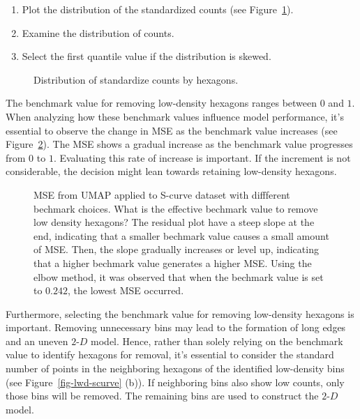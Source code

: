 \documentclass[
  12pt]{article}
\providecommand{\tightlist}{%
  \setlength{\itemsep}{0pt}\setlength{\parskip}{0pt}}\usepackage{longtable,booktabs,array}
\def\tightlist{}
\newcommand\gD{$2\text{-}D$}
\begin{document}
\begin{enumerate}
\def\labelenumi{\arabic{enumi}.}
\tightlist
\item
  Plot the distribution of the standardized counts (see
  Figure~\ref{fig-stdcts-scurve}).
\item
  Examine the distribution of counts.
\item
  Select the first quantile value if the distribution is skewed.
\end{enumerate}

\begin{figure}[H]


\caption{\label{fig-stdcts-scurve}Distribution of standardize counts by
hexagons.}

\end{figure}%

The benchmark value for removing low-density hexagons ranges between
\(0\) and \(1\). When analyzing how these benchmark values influence
model performance, it's essential to observe the change in MSE as the
benchmark value increases (see Figure~\ref{fig-mse-scurve-lwd}). The MSE
shows a gradual increase as the benchmark value progresses from \(0\) to
\(1\). Evaluating this rate of increase is important. If the increment
is not considerable, the decision might lean towards retaining
low-density hexagons.

\begin{figure}[H]


\caption{\label{fig-mse-scurve-lwd}MSE from UMAP applied to S-curve
dataset with diffferent bechmark choices. What is the effective bechmark
value to remove low density hexagons? The residual plot have a steep
slope at the end, indicating that a smaller bechmark value causes a
small amount of MSE. Then, the slope gradually increases or level up,
indicating that a higher bechmark value generates a higher MSE. Using
the elbow method, it was observed that when the bechmark value is set to
\(0.242\), the lowest MSE occurred.}

\end{figure}%

Furthermore, selecting the benchmark value for removing low-density
hexagons is important. Removing unnecessary bins may lead to the
formation of long edges and an uneven \gD{} model. Hence, rather than
solely relying on the benchmark value to identify hexagons for removal,
it's essential to consider the standard number of points in the
neighboring hexagons of the identified low-density bins (see
Figure~\ref{fig-lwd-scurve} (b)). If neighboring bins also show low
counts, only those bins will be removed. The remaining bins are used to
construct the \gD{} model.
\end{document}
